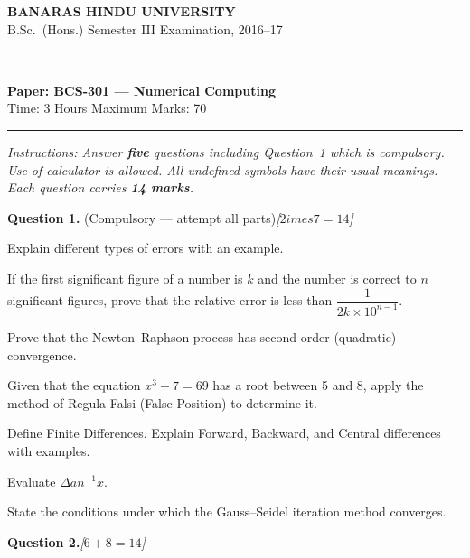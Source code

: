 \documentclass[11pt,a4paper]{article}
\newcommand{\pts}[1]{\hfill   \textit{[#1]}}
\begin{document}
\begin{center}
  {\large\bfseries BANARAS HINDU UNIVERSITY}\\[2pt]
  {
\normalsize B.Sc.\ (Hons.) Semester III Examination, 2016--17}\\[6pt]
  \rule{0.8\linewidth}{0.5pt}\\[6pt]
  {\large\bfseries Paper: BCS-301 --- Numerical Computing}\\[4pt]
  {
\normalsize Time: 3 Hours \hfill Maximum Marks: 70}
\end{center}

\rule{\linewidth}{0.4pt}

\smallskip



\noindent   \textit{Instructions: Answer   \textbf{five} questions including Question~1 which is compulsory. Use of calculator is allowed. All undefined symbols have their usual meanings. Each question carries   \textbf{14 marks}.}

\bigskip




\noindent   \textbf{Question 1.} (Compulsory --- attempt all parts)\pts{$2 imes7=14$}

\begin{parts}
  \item Explain different types of errors with an example.
  \item If the first significant figure of a number is $k$ and the number is correct to $n$ significant figures, prove that the relative error is less than $\dfrac{1}{2k  \times 10^{n-1}}$.
  \item Prove that the Newton--Raphson process has second-order (quadratic) convergence.
  \item Given that the equation $x^3 - 7 = 69$ has a root between 5 and 8, apply the method of Regula-Falsi (False Position) to determine it.
  \item Define Finite Differences. Explain Forward, Backward, and Central differences with examples.
  \item Evaluate $\Delta an^{-1}x$.
  \item State the conditions under which the Gauss--Seidel iteration method converges.
\end{parts}

\bigskip




\noindent   \textbf{Question 2.}\pts{$6+8=14$}
\end{document}
